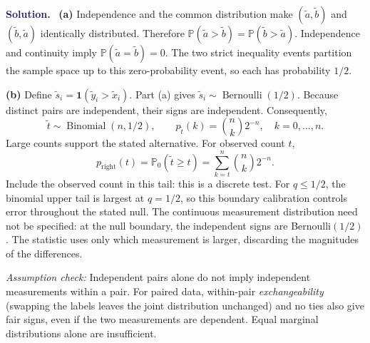\documentclass[11pt]{article}
\newcommand{\rv}[1]{\widetilde{#1}}
\newcommand{\Pbb}{\mathbb P}
\newenvironment{answer}{\par\medskip\noindent\textcolor{MidnightBlue}{\textbf{Solution.}}\ }{\par\medskip}
\begin{document}
\begin{answer}
\textbf{(a)} Independence and the common distribution make
$(\rv a,\rv b)$ and $(\rv b,\rv a)$ identically distributed. Therefore
$\Pbb(\rv a>\rv b)=\Pbb(\rv b>\rv a)$.
Independence and continuity imply $\Pbb(\rv a=\rv b)=0$. The two strict
inequality events partition the sample space up to this zero-probability
event, so each has probability $\boxed{1/2}$.

\textbf{(b)} Define $\rv s_i=\mathbf 1(\rv y_i>\rv x_i)$.
Part (a) gives $\rv s_i\sim\operatorname{Bernoulli}(1/2)$.
Because distinct pairs are independent, their signs are independent.
Consequently,
\[
 \boxed{\rv t\sim\operatorname{Binomial}(n,1/2),\qquad
 p_{\rv t}(k)=\binom nk2^{-n},\quad k=0,\ldots,n.}
\]
Large counts support the stated alternative. For observed count $t$,
\[
 \boxed{p_{\mathrm{right}}(t)=\Pbb_0(\rv t\geq t)
       =\sum_{k=t}^{n}\binom nk2^{-n}.}
\]
Include the observed count in this tail: this is a discrete test.
For $q\leq1/2$, the binomial upper tail is largest at $q=1/2$, so this
boundary calibration controls error throughout the stated null.
The continuous measurement distribution need not be specified: at the
null boundary, the independent signs are Bernoulli$(1/2)$.
The statistic uses only which measurement is larger, discarding the
magnitudes of the differences.

\medskip
\noindent\textit{Assumption check:} Independent pairs alone do not imply
independent measurements within a pair. For paired data, within-pair
\emph{exchangeability} (swapping the labels leaves the joint distribution
unchanged) and no ties also give fair signs, even if the two measurements
are dependent. Equal marginal distributions alone are insufficient.
\end{answer}

\newpage
\end{document}
